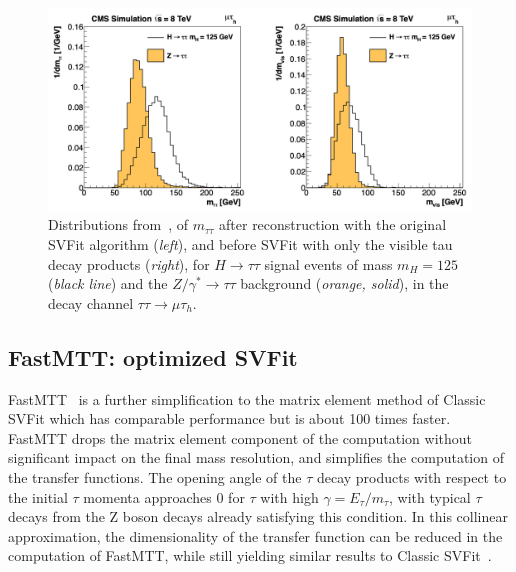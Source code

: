 \begin{figure}[ht]
    \centering
    \includegraphics[width=15cm]{figures/ch-5-object-reconstruction-and-corrections-applied/original_SVFit_resolution_2014_SVFit_Bianchini.png}
    \caption[Distributions of $m_{\tau\tau}$ reconstructed by the classic SVFit algorithm, and masses of visible tau decay products (before SVFit).]{Distributions from~\cite{2014_SVFit_Bianchini}, of $m_{\tau\tau}$ after reconstruction with the original SVFit algorithm (\textit{left}), and before SVFit with only the visible tau decay products (\textit{right}), for $H \rightarrow \tau\tau$ signal events of mass $m_H = 125$\GeV (\textit{black line}) and the $Z/\gamma^* \rightarrow \tau\tau$ background (\textit{orange, solid}), in the decay channel $\tau\tau \rightarrow \mu\tau_{h}$.} 
    \label{fig:classic_svfit_resolution}
\end{figure}


\subsection{FastMTT: optimized SVFit}
FastMTT~\cite{CMS-AN-19-032-FastMTT} is a further simplification to the matrix element method of Classic SVFit which has comparable performance but is about 100 times faster. FastMTT drops the matrix element component of the computation without significant impact on the final mass resolution, and simplifies the computation of the transfer functions. The opening angle of the $\tau$ decay products with respect to the initial $\tau$ momenta approaches 0 for $\tau$ with high $\gamma = E_{\tau}/m_{\tau}$, with typical $\tau$ decays from the Z boson decays already satisfying this condition. In this collinear approximation, the dimensionality of the transfer function can be reduced in the computation of FastMTT, while still yielding similar results to Classic SVFit~\cite{CMS-AN-19-032-FastMTT}. 

